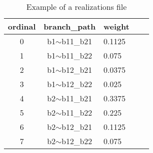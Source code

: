 \begin{table}[htbp]
\centering
\begin{tabular}{cclll}

\hline
\rowcolor{lightgray}
\textbf{ordinal} & \textbf{branch\_path} & \textbf{weight} \\
\hline
0 & b1$\sim$b11\_b21 & 0.1125 \\
1 & b1$\sim$b11\_b22 & 0.075 \\
2 & b1$\sim$b12\_b21 & 0.0375 \\
3 & b1$\sim$b12\_b22 & 0.025 \\
4 & b2$\sim$b11\_b21 & 0.3375 \\
5 & b2$\sim$b11\_b22 & 0.225 \\
6 & b2$\sim$b12\_b21 & 0.1125 \\
7 & b2$\sim$b12\_b22 & 0.075 \\
\hline

\end{tabular}
\caption{Example of a realizations file}
\label{output:realizations}
\end{table}
